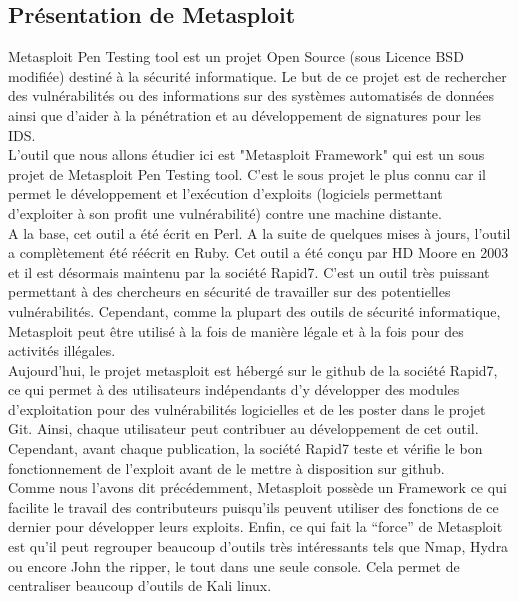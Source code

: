 \subsection{Présentation de Metasploit}
Metasploit Pen Testing tool est un projet Open Source (sous Licence BSD modifiée) destiné à la sécurité informatique. Le but de ce projet est de rechercher des vulnérabilités ou des informations sur des systèmes automatisés de données ainsi que d'aider à la pénétration et au développement de signatures pour les IDS.\\

L'outil que nous allons étudier ici est "Metasploit Framework" qui est un sous projet de
Metasploit Pen Testing tool. C'est le sous projet le plus connu car il permet le développement et l’exécution d’exploits (logiciels permettant d’exploiter à son profit une vulnérabilité) contre une machine distante.\\

A la base, cet outil a été écrit en Perl. A la suite de quelques mises à jours, l'outil a complètement été réécrit en Ruby. Cet outil a été conçu par HD Moore en 2003 et il est désormais maintenu par la société Rapid7. C'est un outil très puissant permettant à des chercheurs en sécurité de travailler sur des potentielles vulnérabilités. Cependant, comme la plupart des outils de sécurité informatique, Metasploit peut être utilisé à la fois de manière légale et à la fois pour des activités illégales.\\
Aujourd'hui, le projet metasploit est hébergé sur le github de la société Rapid7, ce qui permet à des utilisateurs indépendants d'y développer des modules d'exploitation pour des vulnérabilités logicielles et de les poster dans le projet Git. Ainsi, chaque utilisateur peut contribuer au développement de cet outil. Cependant, avant chaque publication, la société Rapid7 teste et vérifie le bon fonctionnement de l'exploit avant de le mettre à disposition sur github.\\
Comme nous l’avons dit précédemment, Metasploit possède un Framework ce qui facilite le travail des contributeurs puisqu’ils peuvent utiliser des fonctions de ce dernier pour développer leurs exploits. Enfin, ce qui fait la “force” de Metasploit est qu’il peut regrouper beaucoup d’outils très intéressants tels que Nmap, Hydra ou encore John the ripper, le tout dans une seule console. Cela permet de centraliser beaucoup d’outils de Kali linux.
